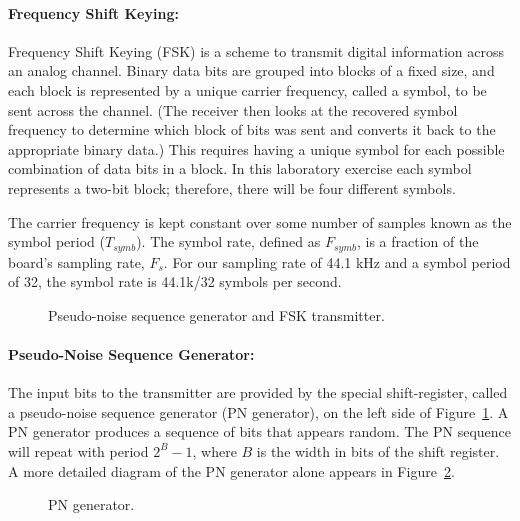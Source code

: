 \paragraph{Frequency Shift Keying:}
Frequency Shift Keying (FSK) is a scheme to transmit digital 
information across an analog channel.  Binary data bits are 
grouped into blocks of a fixed size, and each block is 
represented by a unique carrier frequency, called a symbol, 
to be sent across the channel.  
(The receiver then looks at the recovered symbol frequency to 
determine which block of bits was sent and converts it 
back to the appropriate binary data.)  This requires having 
a unique symbol for each possible combination of 
data bits in a block.  
In this laboratory exercise each symbol 
represents a two-bit block; therefore, there will be four 
different symbols.

The carrier frequency is kept constant over some 
number of samples known as the symbol period ($T_{symb}$).  
The symbol rate, defined as $F_{symb}$, is a fraction of the 
board's sampling rate, $F_s$.  For our sampling rate of 44.1 kHz 
and a symbol period of 32, the symbol rate is 44.1k/32 symbols per second.

\begin{figure}[htb]
   \begin{center}
        \caption{Pseudo-noise sequence generator and FSK transmitter.}
      \label{fig:trans}
   \end{center}
\end{figure}

\paragraph{Pseudo-Noise Sequence Generator:}
The input bits to the transmitter are provided by the special 
shift-register, called a pseudo-noise sequence generator 
(PN generator), on the left side of Figure~\ref{fig:trans}.  
A PN generator produces a
sequence of bits that appears random.  The PN sequence will
repeat with period $2^B-1$, where $B$ is the width in bits 
of the shift register.  A more detailed diagram of the PN 
generator alone appears in Figure~\ref{fig:pn-gen}.

\begin{figure}[htb]
   \begin{center}
        \caption{PN generator.}
      \label{fig:pn-gen}
   \end{center}
\end{figure}

